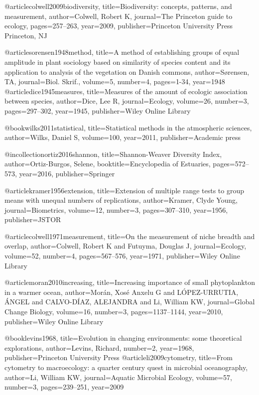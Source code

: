 {{{{{{{{{{{{@article{colwell2009biodiversity,
  title={Biodiversity: concepts, patterns, and measurement},
  author={Colwell, Robert K},
  journal={The Princeton guide to ecology},
  pages={257--263},
  year={2009},
  publisher={Princeton University Press Princeton, NJ}
}


@article{sorensen1948method,
  title={A method of establishing groups of equal amplitude in plant sociology based on similarity of species content and its application to analysis of the vegetation on Danish commons},
  author={S\o{}rensen, TA},
  journal={Biol. Skrif.},
  volume={5},
  number={4},
  pages={1-34},
  year={1948}
}
@article{dice1945measures,
  title={Measures of the amount of ecologic association between species},
  author={Dice, Lee R},
  journal={Ecology},
  volume={26},
  number={3},
  pages={297--302},
  year={1945},
  publisher={Wiley Online Library}
}

@book{wilks2011statistical,
  title={Statistical methods in the atmospheric sciences},
  author={Wilks, Daniel S},
  volume={100},
  year={2011},
  publisher={Academic press}
}


@incollection{ortiz2016shannon,
  title={Shannon-Weaver Diversity Index},
  author={Ortiz-Burgos, Selene},
  booktitle={Encyclopedia of Estuaries},
  pages={572--573},
  year={2016},
  publisher={Springer}
}

@article{kramer1956extension,
  title={Extension of multiple range tests to group means with unequal numbers of replications},
  author={Kramer, Clyde Young},
  journal={Biometrics},
  volume={12},
  number={3},
  pages={307--310},
  year={1956},
  publisher={JSTOR}
}


@article{colwell1971measurement,
  title={On the measurement of niche breadth and overlap},
  author={Colwell, Robert K and Futuyma, Douglas J},
  journal={Ecology},
  volume={52},
  number={4},
  pages={567--576},
  year={1971},
  publisher={Wiley Online Library}
}

@article{moran2010increasing,
  title={Increasing importance of small phytoplankton in a warmer ocean},
  author={Mor{\'a}n, Xos{\'e} Anxelu G and L{\'O}PEZ-URRUTIA, {\'A}NGEL and CALVO-D{\'I}AZ, ALEJANDRA and Li, William KW},
  journal={Global Change Biology},
  volume={16},
  number={3},
  pages={1137--1144},
  year={2010},
  publisher={Wiley Online Library}
}

@book{levins1968,
  title={Evolution in changing environments: some theoretical explorations},
  author={Levins, Richard},
  number={2},
  year={1968},
  publisher={Princeton University Press}
}
@article{li2009cytometry,
  title={From cytometry to macroecology: a quarter century quest in microbial oceanography},
  author={Li, William KW},
  journal={Aquatic Microbial Ecology},
  volume={57},
  number={3},
  pages={239--251},
  year={2009}
}

}}}}}}}}}}}}
